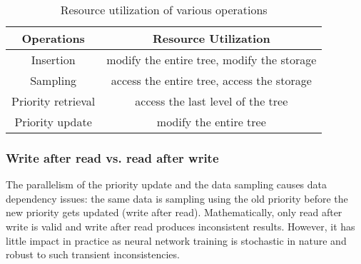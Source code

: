 \begin{table}[!t]
    \centering
    \caption{Resource utilization of various operations}
    \vspace{-1em}
    \begin{tabular}{cc}
        \toprule
        Operations & Resource Utilization  \\
        \midrule
        Insertion & modify the entire tree, modify the storage \\
        Sampling & access the entire tree, access the storage \\
        Priority retrieval & access the last level of the tree \\
        Priority update & modify the entire tree \\
        \bottomrule
    \end{tabular}
    \label{table:resource_util}
\end{table}

\subsubsection{Write after read vs. read after write}
The parallelism of the priority update and the data sampling causes data dependency issues: the same data is sampling using the old priority before the new priority gets updated (write after read). Mathematically, only read after write is valid and write after read produces inconsistent results. However, it has little impact in practice as neural network training is stochastic in nature and robust to such transient inconsistencies.
